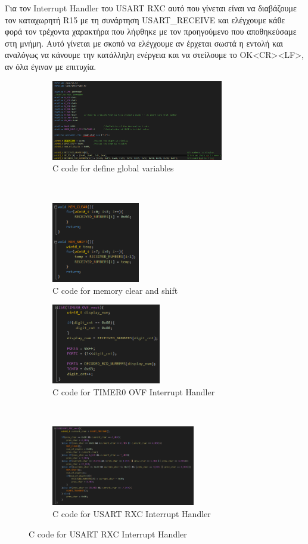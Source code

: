 \documentclass{article}
\begin{document}
	\pagebreak
	\noindent   
	Για τον Interrupt Handler του USART RXC αυτό που γίνεται είναι να διαβάζουμε τον καταχωρητή R15 με τη συνάρτηση USART\_RECEIVE και ελέγχουμε κάθε φορά τον τρέχοντα χαρακτήρα που λήφθηκε με τον προηγούμενο που αποθηκεύσαμε στη μνήμη. Αυτό γίνεται με σκοπό να ελέγχουμε αν έρχεται σωστά η εντολή και αναλόγως να κάνουμε την κατάλληλη ενέργεια και να στείλουμε το OK<CR><LF>, αν όλα έγιναν με επιτυχία. \\
	
	\begin{figure}[h!]
		\centering
		\begin{subfigure}[t]{0.5\textwidth}
			\centering
			\includegraphics[height=3.5cm, width=\linewidth]{./results/lab5_defines.png}
			\caption{C code for define global variables}
		\end{subfigure}%
		~
		\begin{subfigure}[t]{0.5\textwidth}
			\centering
			\includegraphics[height=3.5cm, width=\linewidth]{./results/lab5_mem_handling.png}
			\caption{C code for memory clear and shift}
		\end{subfigure}
	
		\begin{subfigure}[t]{0.5\textwidth}
			\centering
			\includegraphics[height=3.5cm, width=\linewidth]{./results/lab5_timer0_handler.png}
			\caption{C code for TIMER0 OVF Interrupt Handler}
		\end{subfigure}%
		~
		\begin{subfigure}[t]{0.5\textwidth}
			\centering
			\includegraphics[height=3.5cm, width=\linewidth]{./results/lab5_usart_handler.png}
			\caption{C code for USART RXC Interrupt Handler}
		\end{subfigure}	
	

\end{figure}
\end{document}
